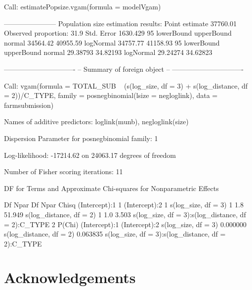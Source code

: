 \documentclass[
]{jss}
\newcommand{\1}{\mathcal{I}} \newcommand{\bx}{\boldsymbol{x}}
\begin{document}
\begin{CodeChunk}
\begin{CodeOutput}
Call:
estimatePopsize.vgam(formula = modelVgam)

-----------------------
Population size estimation results: 
Point estimate 37760.01
Observed proportion: 31.9%
Std. Error 1630.429
95%
          lowerBound upperBound
normal      34564.42   40955.59
logNormal   34757.77   41158.93
95%
          lowerBound upperBound
normal      29.38793   34.82193
logNormal   29.24274   34.62823

-------------------------------
-- Summary of foreign object --
-------------------------------

Call:
vgam(formula = TOTAL_SUB ~ (s(log_size, df = 3) + s(log_distance, 
    df = 2))/C_TYPE, family = posnegbinomial(lsize = negloglink), 
    data = farmsubmission)

Names of additive predictors: loglink(munb), negloglink(size)

Dispersion Parameter for posnegbinomial family:   1

Log-likelihood: -17214.62 on 24063.17 degrees of freedom

Number of Fisher scoring iterations:  11 

DF for Terms and Approximate Chi-squares for Nonparametric Effects

                                                   Df Npar Df Npar Chisq
(Intercept):1                                       1                   
(Intercept):2                                       1                   
s(log_size, df = 3)                                 1     1.8     51.949
s(log_distance, df = 2)                             1     1.0      3.503
s(log_size, df = 3):s(log_distance, df = 2):C_TYPE  2                   
                                                     P(Chi)
(Intercept):1                                              
(Intercept):2                                              
s(log_size, df = 3)                                0.000000
s(log_distance, df = 2)                            0.063835
s(log_size, df = 3):s(log_distance, df = 2):C_TYPE         
\end{CodeOutput}
\end{CodeChunk}

\normalsize

\section*{Acknowledgements}
\end{document}
